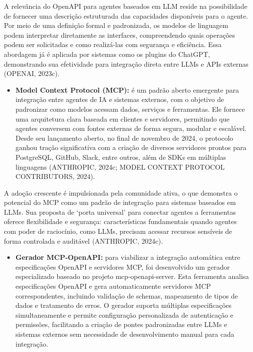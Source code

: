 \documentclass[
]{article}
\providecommand{\tightlist}{%
  \setlength{\itemsep}{0pt}\setlength{\parskip}{0pt}}
\begin{document}
A relevância do OpenAPI para agentes baseados em LLM reside na
possibilidade de fornecer uma descrição estruturada das capacidades
disponíveis para o agente. Por meio de uma definição formal e
padronizada, os modelos de linguagem podem interpretar diretamente as
interfaces, compreendendo quais operações podem ser solicitadas e como
realizá-las com segurança e eficiência. Essa abordagem já é aplicada por
sistemas como os plugins do ChatGPT, demonstrando sua efetividade para
integração direta entre LLMs e APIs externas (OPENAI, 2023c).

\begin{itemize}
\tightlist
\item
  \textbf{Model Context Protocol (MCP):} é um padrão aberto emergente
  para integração entre agentes de IA e sistemas externos, com o
  objetivo de padronizar como modelos acessam dados, serviços e
  ferramentas. Ele fornece uma arquitetura clara baseada em clientes e
  servidores, permitindo que agentes conversem com fontes externas de
  forma segura, modular e escalável. Desde seu lançamento aberto, no
  final de novembro de 2024, o protocolo ganhou tração significativa com
  a criação de diversos servidores prontos para PostgreSQL, GitHub,
  Slack, entre outros, além de SDKs em múltiplas linguagens (ANTHROPIC,
  2024c; MODEL CONTEXT PROTOCOL CONTRIBUTORS, 2024).
\end{itemize}

A adoção crescente é impulsionada pela comunidade ativa, o que demonstra
o potencial do MCP como um padrão de integração para sistemas baseados
em LLMs. Sua proposta de `porta universal' para conectar agentes a
ferramentas oferece flexibilidade e segurança: características
fundamentais quando agentes com poder de raciocínio, como LLMs, precisam
acessar recursos sensíveis de forma controlada e auditável (ANTHROPIC,
2024c).

\begin{itemize}
\tightlist
\item
  \textbf{Gerador MCP-OpenAPI:} para viabilizar a integração automática
  entre especificações OpenAPI e servidores MCP, foi desenvolvido um
  gerador especializado baseado no projeto mcp-openapi-server. Esta
  ferramenta analisa especificações OpenAPI e gera automaticamente
  servidores MCP correspondentes, incluindo validação de schemas,
  mapeamento de tipos de dados e tratamento de erros. O gerador suporta
  múltiplas especificações simultaneamente e permite configuração
  personalizada de autenticação e permissões, facilitando a criação de
  pontes padronizadas entre LLMs e sistemas externos sem necessidade de
  desenvolvimento manual para cada integração.
\end{itemize}
\end{document}
